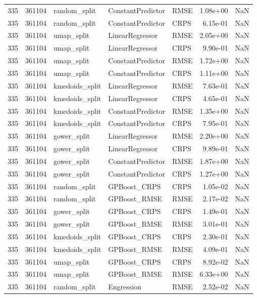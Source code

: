 \begin{tabular}{rrlllrr}
335 & 361104 & random\_split & ConstantPredictor & RMSE & 1.08e+00 & NaN \\
335 & 361104 & random\_split & ConstantPredictor & CRPS & 6.15e-01 & NaN \\
335 & 361104 & umap\_split & LinearRegressor & RMSE & 2.05e+00 & NaN \\
335 & 361104 & umap\_split & LinearRegressor & CRPS & 9.90e-01 & NaN \\
335 & 361104 & umap\_split & ConstantPredictor & RMSE & 1.72e+00 & NaN \\
335 & 361104 & umap\_split & ConstantPredictor & CRPS & 1.11e+00 & NaN \\
335 & 361104 & kmedoids\_split & LinearRegressor & RMSE & 7.63e-01 & NaN \\
335 & 361104 & kmedoids\_split & LinearRegressor & CRPS & 4.65e-01 & NaN \\
335 & 361104 & kmedoids\_split & ConstantPredictor & RMSE & 1.35e+00 & NaN \\
335 & 361104 & kmedoids\_split & ConstantPredictor & CRPS & 7.95e-01 & NaN \\
335 & 361104 & gower\_split & LinearRegressor & RMSE & 2.20e+00 & NaN \\
335 & 361104 & gower\_split & LinearRegressor & CRPS & 9.89e-01 & NaN \\
335 & 361104 & gower\_split & ConstantPredictor & RMSE & 1.87e+00 & NaN \\
335 & 361104 & gower\_split & ConstantPredictor & CRPS & 1.27e+00 & NaN \\
335 & 361104 & random\_split & GPBoost\_CRPS & CRPS & 1.05e-02 & NaN \\
335 & 361104 & random\_split & GPBoost\_RMSE & RMSE & 2.17e-02 & NaN \\
335 & 361104 & gower\_split & GPBoost\_CRPS & CRPS & 1.49e-01 & NaN \\
335 & 361104 & gower\_split & GPBoost\_RMSE & RMSE & 3.01e-01 & NaN \\
335 & 361104 & kmedoids\_split & GPBoost\_CRPS & CRPS & 2.30e-01 & NaN \\
335 & 361104 & kmedoids\_split & GPBoost\_RMSE & RMSE & 4.09e-01 & NaN \\
335 & 361104 & umap\_split & GPBoost\_CRPS & CRPS & 8.92e-02 & NaN \\
335 & 361104 & umap\_split & GPBoost\_RMSE & RMSE & 6.33e+00 & NaN \\
335 & 361104 & random\_split & Engression & RMSE & 2.52e-02 & NaN \\

\end{tabular}
